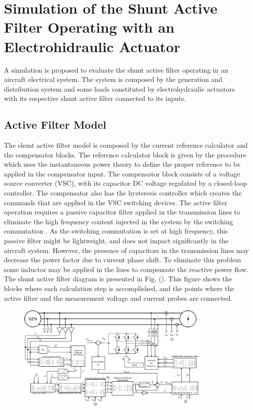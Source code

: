 \section{Simulation of the Shunt Active Filter Operating with an Electrohidraulic Actuator}

A simulation is proposed to evaluate the shunt active filter operating in an aircraft electrical system. The system is composed by the generation and distribution system and some loads constituted by electrohydraulic actuators with its respective shunt active filter connected to its inputs.

\subsection{Active Filter Model}

The shunt active filter model is composed by the current reference calculator and the compensator blocks. The reference calculator block is given by the procedure which uses the instantaneous power theory to define the proper reference to be applied in the compensator input. The compensator block consists of a voltage source converter (VSC), with its capacitor DC voltage regulated by a closed-loop controller. The compensator also has the hysteresis controller which creates the commands that are applied in the VSC switching devices.
The active filter operation requires a passive capacitor filter applied in the transmission lines to eliminate the high frequency content injected in the system by the switching commutation \cite{}. As the switching commutation is set at high frequency, this passive filter might be lightweight, and does not impact significantly in the aircraft system. However, the presence of capacitors in the transmission lines may decrease the power factor due to current phase shift. To eliminate this problem some inductor may be applied in the lines to compensate the reactive power flow.
The shunt active filter diagram is presented in Fig. (). This figure shows the blocks where each calculation step is accomplished, and the points where the active filter and the measurement voltage and current probes are connected.

\begin{figure}[!b] %
	\centering
	\includegraphics[width=0.85\textwidth]{Figures/filtro_blocos.png}
	\caption{}
	\label{fig:filtro_blocos.png}
\end{figure}

